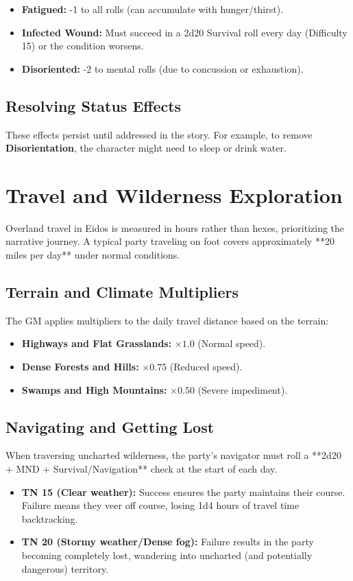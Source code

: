 \begin{itemize}
    \item \textbf{Fatigued:} -1 to all rolls (can accumulate with hunger/thirst).
    \item \textbf{Infected Wound:} Must succeed in a 2d20 Survival roll every day (Difficulty 15) or the condition worsens.
    \item \textbf{Disoriented:} -2 to mental rolls (due to concussion or exhaustion).
\end{itemize}

\subsection{Resolving Status Effects}

These effects persist until addressed in the story. For example, to remove \textbf{Disorientation}, the character might need to sleep or drink water.

\section{Travel and Wilderness Exploration}

Overland travel in Eidos is measured in hours rather than hexes, prioritizing the narrative journey. A typical party traveling on foot covers approximately **20 miles per day** under normal conditions. 

\subsection{Terrain and Climate Multipliers}

The GM applies multipliers to the daily travel distance based on the terrain:
\begin{itemize}
    \item \textbf{Highways and Flat Grasslands:} $\times 1.0$ (Normal speed).
    \item \textbf{Dense Forests and Hills:} $\times 0.75$ (Reduced speed).
    \item \textbf{Swamps and High Mountains:} $\times 0.50$ (Severe impediment).
\end{itemize}

\subsection{Navigating and Getting Lost}

When traversing uncharted wilderness, the party's navigator must roll a **2d20 + MND + Survival/Navigation** check at the start of each day.
\begin{itemize}
    \item \textbf{TN 15 (Clear weather):} Success ensures the party maintains their course. Failure means they veer off course, losing 1d4 hours of travel time backtracking.
    \item \textbf{TN 20 (Stormy weather/Dense fog):} Failure results in the party becoming completely lost, wandering into uncharted (and potentially dangerous) territory.
\end{itemize}

